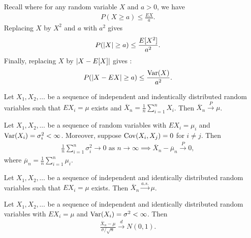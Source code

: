Recall  where for any random variable $X$ and $a > 0$, we have
\begin{align}
    P(X \geq a) \leq \frac{EX}{a}.
\end{align}
Replacing $X$ by $X^{2}$ and $a$ with $a^{2}$ gives
\begin{align}
    P(\left| X \right| \geq a) \leq \frac{E[X^{2}]}{a^{2}}.
\end{align}
Finally, replacing $X$ by $\left| X - E[X] \right|$ gives :
\begin{align}
    P(\left| X - EX \right| \geq a) \leq \frac{\operatorname{Var}(X)}{a^{2}}.
\end{align}

\begin{theorem}
    Let $X_{1}, X_{2}, \ldots$ be a sequence of independent and indentically distributed random variables such that $EX_{i} = \mu$ exists and $\overline{X}_{n} = \frac{1}{n} \sum_{i=1}^{n} X_{i}$. Then $\overline{X}_{n} \xrightarrow{P} \mu$.
\end{theorem}

\begin{theorem}
    Let $X_{1}, X_{2}, \ldots$ be a sequence of random variables with $EX_{i} = \mu_{i}$ and $\operatorname{Var}(X_{i}) = \sigma_{i}^{2} < \infty$. Moreover, suppose $\operatorname{Cov}(X_{i},X_{j}) = 0$ for $i \neq j$. Then
    \begin{align}
        \frac{1}{n} \sum_{i=1}^{n} \sigma_{i}^{2} \to 0 \text{ as } n \to \infty \implies \overline{X}_{n} - \overline{\mu}_{n} \xrightarrow{P} 0,
    \end{align}
    where $\overline{\mu}_{n} = \frac{1}{n} \sum_{i=1}^{n} \mu_{i}$.
\end{theorem}

\begin{theorem}
    Let $X_{1}, X_{2}, \ldots$ be a sequence of independent and identically distributed random variables such that $EX_{i} = \mu$ exists. Then $\overline{X}_{n} \xrightarrow{a.s.} \mu$.
\end{theorem}

\begin{theorem}
    Let $X_{1},X_{2},\ldots$ be a sequence of independent and identically distributed random variables with $EX_{i} = \mu$ and $\operatorname{Var}(X_{i}) = \sigma^{2} < \infty$. Then
    \begin{align}
        \frac{\overline{X}_{n} - \mu}{\sigma/\sqrt{n}} \xrightarrow{d} N(0,1).
    \end{align}
\end{theorem}

